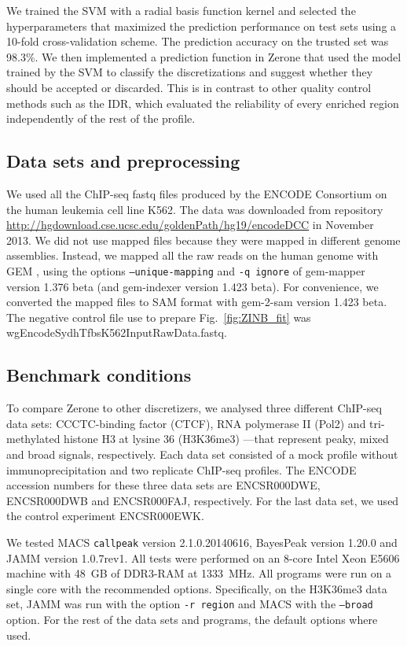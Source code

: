 \documentclass{bioinfo}
\begin{document}
\begin{methods}
We trained the SVM with a radial basis function kernel and
selected the hyperparameters that maximized the prediction
performance on test sets using a 10-fold cross-validation scheme.
The prediction accuracy on the trusted set was 98.3\%.
We then implemented a prediction function in Zerone that used the
model trained by the SVM to classify the discretizations and
suggest whether they should be accepted or discarded.
This is in contrast to other quality control methods such as the IDR, which
evaluated the reliability of every enriched region independently of the rest
of the profile.

\subsection{Data sets and preprocessing}
We used all the ChIP-seq fastq files produced by the ENCODE Consortium
on the human leukemia cell line K562. The data was
downloaded from repository
\href{http://hgdownload.cse.ucsc.edu/goldenPath/hg19/encodeDCC}{http://hgdownload.cse.ucsc.edu/goldenPath/hg19/encodeDCC} in November 2013.
We did not use mapped files because they were mapped in different
genome assemblies.
Instead, we mapped all the raw reads on the human genome with GEM
\citep{pmid23103880}, using the options \texttt{--unique-mapping} and
\texttt{-q ignore} of gem-mapper version 1.376 beta (and gem-indexer version
1.423 beta).
For convenience, we converted the mapped files to SAM format with
gem-2-sam version 1.423 beta.
The negative control file use to prepare Fig.~\ref{fig:ZINB_fit}
was wgEncodeSydhTfbsK562InputRawData.fastq.

\subsection{Benchmark conditions}
\label{sub:bench_cond}
To compare Zerone to other discretizers, we analysed three different
ChIP-seq data sets: CCCTC-binding factor (CTCF), RNA polymerase II
(Pol2) and tri-methylated histone H3 at lysine 36 (H3K36me3) ---that
represent peaky, mixed and broad signals, respectively. Each
data set consisted of a mock profile without immunoprecipitation
and two replicate ChIP-seq profiles.
The ENCODE accession numbers for these three data sets are
ENCSR000DWE, ENCSR000DWB and ENCSR000FAJ, respectively. For the last data set,
we used the control experiment ENCSR000EWK.

We tested MACS \texttt{callpeak} version 2.1.0.20140616, BayesPeak
version 1.20.0 and JAMM version 1.0.7rev1. All tests were performed on
an 8-core Intel Xeon E5606 machine with 48~GB of DDR3-RAM at 1333~MHz.
All programs were run on a single core with the recommended options.
Specifically, on the H3K36me3 data set, JAMM was run with the option
\texttt{-r region} and MACS with the \texttt{--broad} option. For the rest of
the data sets and programs, the default options where used.


\end{methods}
\end{document}
